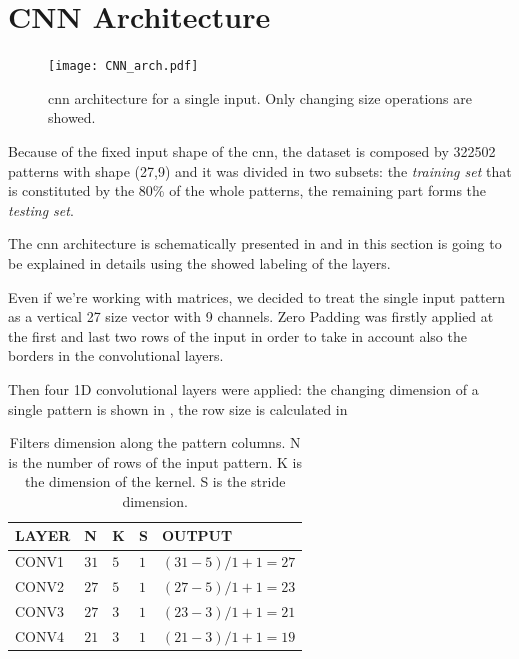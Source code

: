 

\section{CNN Architecture}
\label{sec:cnn_architecture}
\begin{figure}[htp]
\texttt{[image: CNN\_arch.pdf]}
\caption{\gls{cnn} architecture for a single input. Only changing size operations are showed.}
\label{fig:CNN}
\end{figure}


Because of the fixed input shape of the \gls{cnn}, the dataset  is composed by 322502 patterns with shape (27,9) and it was divided in two subsets: the \textit{training set} that is constituted by the 80\% of the whole patterns, the remaining part forms the \textit{testing set}.

The \gls{cnn} architecture is schematically presented in  and in this section is going to be explained in details using the showed labeling of the layers.

Even if we're working with matrices, we decided to treat the single input pattern as a vertical 27 size vector with 9 channels. Zero Padding was firstly applied at the first and last two rows of the input in order to take in account also the borders in the convolutional layers.

Then four 1D convolutional layers were applied: the changing dimension of a single pattern is shown in , the row size is calculated in 

\begin{table}[htp]
\small
	\centering
		\renewcommand{\arraystretch}{1}%
	\begin{tabular}{@{}lllll@{}}
	\toprule
	LAYER & N & K & S & OUTPUT\\
	\midrule
	CONV1 & $31$ & $5$ & $1$ & $(31-5)/1+1 = 27$\\
	CONV2 & $27$ & $5$ & $1$ & $(27-5)/1+1 = 23$\\
	CONV3 & $27$ & $3$ & $1$ & $(23-3)/1+1 = 21$\\
	CONV4 & $21$ & $3$ & $1$ & $(21-3)/1+1 = 19$\\
	\bottomrule
	\end{tabular}
	\caption{Filters dimension along the pattern columns. N is the number of rows of the input pattern. K is the dimension of the kernel. S is the stride dimension.}
	\label{tab:filtersize}
\end{table}

